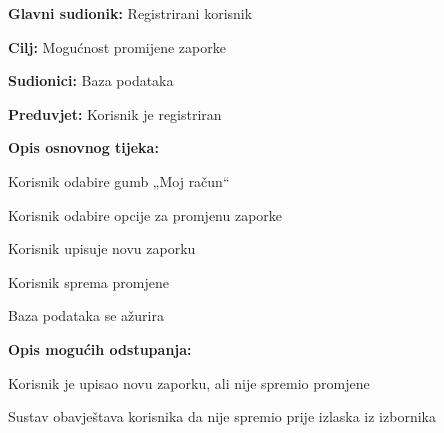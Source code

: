 					
										\noindent {}
					\begin{packed_item}
	
						\item \textbf{Glavni sudionik: } Registrirani korisnik
						\item  \textbf{Cilj:} Mogućnost promijene zaporke
						\item  \textbf{Sudionici:} Baza podataka
						\item  \textbf{Preduvjet:} Korisnik je registriran
						\item  \textbf{Opis osnovnog tijeka:}
						
						\item[] \begin{packed_enum}
	
							    \item Korisnik odabire gumb „Moj račun“
    							\item Korisnik odabire opcije za promjenu zaporke
    							\item Korisnik upisuje novu zaporku
    							\item Korisnik sprema promjene
    							\item Baza podataka se ažurira
						\end{packed_enum}
						
						\item  \textbf{Opis mogućih odstupanja:}
						
						\item[] \begin{packed_item}
	
							\item[5.d] Korisnik je upisao novu zaporku, ali nije spremio promjene
							\item[] \begin{packed_enum}
								
								\item  Sustav obavještava korisnika da nije spremio prije izlaska iz izbornika
								
							\end{packed_enum}
							
						\end{packed_item}
					\end{packed_item}
					
